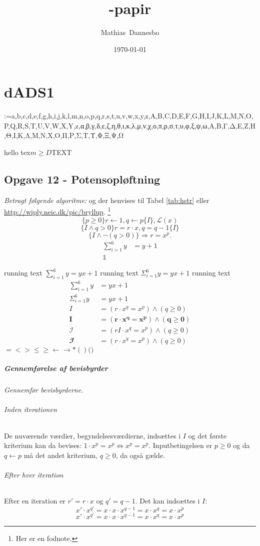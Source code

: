 \documentclass[a4paper,final,12pt,oneside,article,table]{memoir}
\newcommand{\supertitle}[1]{\gdef\suP{#1}}
\newcommand{\subtitle}[1]{\gdef\suB{#1}}
\newcommand{\stunum}[1]{\gdef\stuN{#1}}
\begin{document}
\supertitle{Programmerings Sprog}
\title{\VC-papir}
\subtitle{Genaflevering}
\author{Mathias~Dannesbo}
\stunum{201206106}
\date{\today}
\maketitle

\chapter{dADS1}

\makeatletter
\@for\@tempa:=a,b,c,d,e,f,g,h,i,j,k,l,m,n,o,p,q,r,s,t,u,v,w,x,y,z,A,B,C,D,E,F,G,H,I,J,K,L,M,N,O,P,Q,R,S,T,U,V,W,X,Y,z,α,β,γ,δ,ε,ζ,η,θ,ι,κ,λ,μ,ν,χ,ο,π,ρ,σ,τ,υ,φ,ξ,ψ,ω,Α,Β,Γ,Δ,Ε,Ζ,Η,Θ,Ι,Κ,Λ,Μ,Ν,Χ,Ο,Π,Ρ,Σ,Τ,Υ,Φ,Ξ,Ψ,Ω\do{%
\expandafter\textit{\@tempa}$\@tempa$ }
\makeatother


{\HUGE \VC \CERM}
hello \VC tex$m ≥D$TEXT
\section{\VC Opgave 12 - Potensopløftning}
\textit{Betragt følgende algoritme:} og der henvises til Tabel \ref{tab:hstr} eller \url{http://wiply.neic.dk/pic/bryllup}. \TKET\footnote{Her er en fodnote.}
\[\{ p \geq 0 \} r←1, q←p\{I\}, \mathcal{L}(x)\]
\[\{I ∧ q > 0 \} r=r·x, q= q-1\{I\}\]
\[\{I ∧ ¬(q > 0) \} ⇒ r=x^p.\]
\begin{align*}
    \sum_{i=1}^6 y&= y+1\\
    \mathbb{1}&
\end{align*}

running text $\sum_{i=1}^6 y= yx+1$ running text $Σ_{i=1}^6 y= yx+1$ running text
\begin{align*}
  \sum_{i=1}^6 y&= yx+1\\
  Σ_{i=1}^6 y&= yx+1\\
  I &= (r·x^q = x^p) ∧ (q \geq 0)\\
  \mathbf{I} &= \mathbf{(r·x^q = x^p) ∧ (q \geq 0)}\\
  \mathcal{I} &= (rI·x^q = x^p) ∧ (q \geq 0)\\
  \mathbfcal{I} &= (r·x^q = x^p) ∧ (q \geq 0)
\end{align*}
$=<>≤≥←→*()\Bigg(\Bigg)$

\paragraph{Gennemførelse af bevisbyrder}
\textit{Gennemfør bevisbyrderne.}
\subparagraph{Inden iterationen} De nuværende værdier, begyndelsesværdierne, indsættes i $I$ og det første kriterium kan da bevises: $1·x^p = x^p ⇔ x^p = x^p$. Inputbetingelsen er $p \geq 0$ og da $q←p$ må det andet kriterium, $q \geq 0$, da også gælde.
\subparagraph{Efter hver iteration} Efter en iteration er $r'=r·x$ og $q'=q-1$. Det kan indsættes i $I$:
\[ x' · x^{q'} = x·x·x^{q-1} = x·x^q = x·x^p \]
\[ x\prime · x^{q\prime} = x·x·x^{q-1} = x·x^q = x·x^p \]
\end{document}
